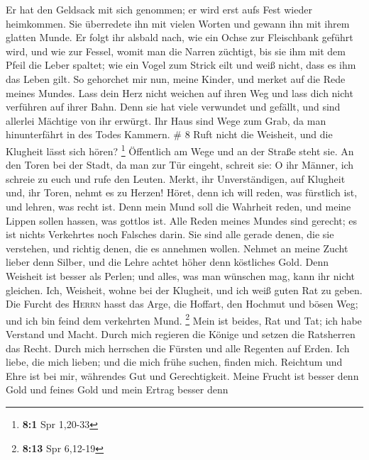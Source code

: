  Er hat den Geldsack mit sich genommen; er wird erst aufs
Fest wieder heimkommen.  Sie überredete ihn mit vielen
Worten und gewann ihn mit ihrem glatten Munde.  Er folgt
ihr alsbald nach, wie ein Ochse zur Fleischbank geführt wird, und wie
zur Fessel, womit man die Narren züchtigt,  bis sie ihm
mit dem Pfeil die Leber spaltet; wie ein Vogel zum Strick eilt und weiß
nicht, dass es ihm das Leben gilt.  So gehorchet mir nun,
meine Kinder, und merket auf die Rede meines Mundes. 
Lass dein Herz nicht weichen auf ihren Weg und lass dich nicht verführen
auf ihrer Bahn.  Denn sie hat viele verwundet und
gefällt, und sind allerlei Mächtige von ihr erwürgt.  Ihr
Haus sind Wege zum Grab, da man hinunterfährt in des Todes Kammern. \# 8
 Ruft nicht die Weisheit, und die Klugheit lässt sich
hören? \footnote{\textbf{8:1} Spr 1,20-33}  Öffentlich am
Wege und an der Straße steht sie.  An den Toren bei der
Stadt, da man zur Tür eingeht, schreit sie:  O ihr Männer,
ich schreie zu euch und rufe den Leuten.  Merkt, ihr
Unverständigen, auf Klugheit und, ihr Toren, nehmt es zu Herzen!
 Höret, denn ich will reden, was fürstlich ist, und
lehren, was recht ist.  Denn mein Mund soll die Wahrheit
reden, und meine Lippen sollen hassen, was gottlos ist. 
Alle Reden meines Mundes sind gerecht; es ist nichts Verkehrtes noch
Falsches darin.  Sie sind alle gerade denen, die sie
verstehen, und richtig denen, die es annehmen wollen. 
Nehmet an meine Zucht lieber denn Silber, und die Lehre achtet höher
denn köstliches Gold.  Denn Weisheit ist besser als
Perlen; und alles, was man wünschen mag, kann ihr nicht gleichen.
 Ich, Weisheit, wohne bei der Klugheit, und ich weiß
guten Rat zu geben.  Die Furcht des \textsc{Herrn} hasst
das Arge, die Hoffart, den Hochmut und bösen Weg; und ich bin feind dem
verkehrten Mund. \footnote{\textbf{8:13} Spr 6,12-19} 
Mein ist beides, Rat und Tat; ich habe Verstand und Macht.
 Durch mich regieren die Könige und setzen die Ratsherren
das Recht.  Durch mich herrschen die Fürsten und alle
Regenten auf Erden.  Ich liebe, die mich lieben; und die
mich frühe suchen, finden mich.  Reichtum und Ehre ist
bei mir, währendes Gut und Gerechtigkeit.  Meine Frucht
ist besser denn Gold und feines Gold und mein Ertrag besser denn
